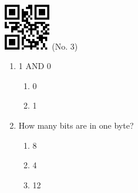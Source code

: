 \documentclass[twocolumn]{article}
\title{}
\date{}
\begin{document}

\begin{center}
 \hspace{0.2cm}
 \includegraphics[width=2cm]{qrcode-3.png}
 \hspace{0.5cm}
 \Large{  (No. 3) }
\end{center}



\begin{enumerate}



  \item 1 AND 0

  \begin{enumerate}
   
   \item 0
   
   \item 1
   
  \end{enumerate}



  \item How many bits are in one byte?

  \begin{enumerate}
   
   \item 8
   
   \item 4
   
   \item 12
   
  \end{enumerate}


\end{enumerate}


\end{document}
